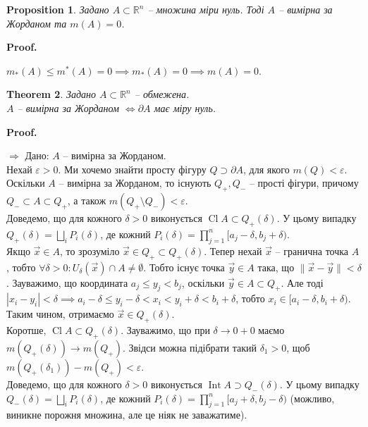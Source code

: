 \documentclass[a4paper, 10pt]{article}
\makeatletter
\def\qed{$\blacksquare$}
\def\rightproof{$\boxed{\Rightarrow}$ }
\theoremstyle{theoremdd}
\newtheorem{theorem}{Theorem}[subsection]
\theoremstyle{theoremdd}
\theoremstyle{theoremdd}
\theoremstyle{theoremdd}
\theoremstyle{theoremdd}
\theoremstyle{theoremdd}
\theoremstyle{theoremdd}
\theoremstyle{theoremdd}
\theoremstyle{theoremdd}
\newtheorem{proposition}[theorem]{Proposition}
\theoremstyle{theoremdd}
\theoremstyle{theoremdd}
\theoremstyle{theoremdd}
\theoremstyle{theoremdd}
\theoremstyle{theoremdd}
\theoremstyle{theoremdd}
\renewenvironment{proof}[1][Proof.\\]{\par
\pushQED{\hfill \qed}%
\normalfont \topsep6\p@\@plus6\p@\relax
\trivlist
\item\relax
{\bfseries
#1\@addpunct{.}}\hspace\labelsep\ignorespaces
}{%
\popQED\endtrivlist\@endpefalse
}
\DeclareMathOperator{\Int}{Int}
\DeclareMathOperator{\Cl}{Cl}
\makeatother
\begin{document}
\begin{proposition}
Задано $A \subset \mathbb{R}^n$ -- множина міри нуль. Тоді $A$ -- вимірна за Жорданом та $m(A) = 0$.
\end{proposition}

\begin{proof}
$m_*(A) \leq m^*(A) = 0 \implies m_*(A) = 0 \implies m(A) = 0$.
\end{proof}

\begin{theorem}
Задано $A \subset \mathbb{R}^n$ -- обмежена.\\
$A$ -- вимірна за Жорданом $\iff \partial A$ має міру нуль.
\end{theorem}

\begin{proof}
\rightproof Дано: $A$ -- вимірна за Жорданом.\\
Нехай $\varepsilon > 0$. Ми хочемо знайти просту фігуру $Q \supset \partial A$, для якого $m(Q) < \varepsilon$.\\
Оскільки $A$ -- вимірна за Жорданом, то існують $Q_+,Q_-$ -- прості фігури, причому $Q_- \subset A \subset Q_+$, а також $m(Q_+ \setminus Q_-) < \varepsilon$.\\
Доведемо, що для кожного $\delta > 0$ виконується $\Cl A \subset Q_+(\delta)$. У цьому випадку $Q_+(\delta) = \displaystyle\bigsqcup_i P_i(\delta)$, де кожний $P_i(\delta) = \displaystyle\prod_{j=1}^n [a_j-\delta, b_j+\delta)$. \\
Якщо $\vec{x} \in A$, то зрозуміло $\vec{x} \in Q_+ \subset Q_+(\delta)$. Тепер нехай $\vec{x}$ -- гранична точка $A$, тобто $\forall \delta > 0: U_\delta(\vec{x}) \cap A \neq \emptyset$. Тобто існує точка $\vec{y} \in A$ така, що $\|\vec{x} - \vec{y}\| < \delta$. Зауважимо, що координата $a_j \leq y_j < b_j$, оскільки $\vec{y} \in A \subset Q_+$. Але тоді $|x_i - y_i| < \delta \implies a_i-\delta \leq y_i - \delta < x_i < y_i + \delta < b_i + \delta$, тобто $x_i \in [a_i-\delta,b_i+\delta)$. Таким чином, отримаємо $\vec{x} \in Q_+(\delta)$.\\
Коротше, $\Cl A \subset Q_+(\delta)$. Зауважимо, що при $\delta \to 0+0$ маємо $m(Q_+(\delta)) \to m(Q_+)$. Звідси можна підібрати такий $\delta_1 > 0$, щоб $m(Q_+(\delta_1)) - m(Q_+) < \varepsilon$.
\bigskip \\
Доведемо, що для кожного $\delta > 0$ виконується $\Int A \supset Q_-(\delta)$. У цьому випадку $Q_-(\delta) = \displaystyle\bigsqcup_i P_i(\delta)$, де кожний $P_i(\delta) = \displaystyle\prod_{j=1}^n [a_j+\delta,b_j-\delta)$ (можливо, виникне порожня множина, але це ніяк не заважатиме).\\

\end{proof}
\end{document}

